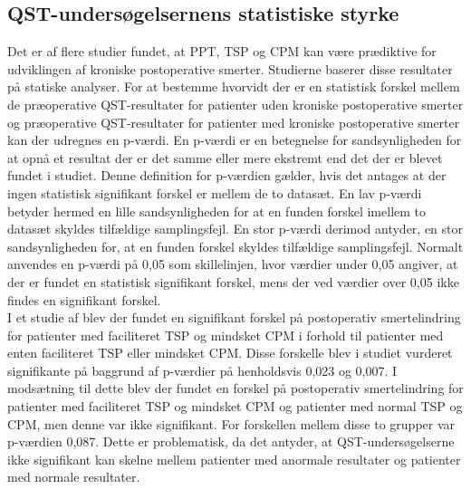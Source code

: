 \subsection{QST-undersøgelsernens statistiske styrke}
Det er af flere studier fundet, at PPT, TSP og CPM kan være prædiktive for udviklingen af kroniske postoperative smerter. \citep{Wylde2016c} \citep{Petersen2016} Studierne baserer disse resultater på statiske analyser. For at bestemme hvorvidt der er en statistisk forskel mellem de præoperative QST-resultater for patienter uden kroniske postoperative smerter og præoperative QST-resultater for patienter med kroniske postoperative smerter kan der udregnes en p-værdi. En p-værdi er en betegnelse for sandsynligheden for at opnå et resultat der er det samme eller mere ekstremt end det der er blevet fundet i studiet. Denne definition for p-værdien gælder, hvis det antages at der ingen statistisk signifikant forskel er mellem de to datasæt. En lav p-værdi betyder hermed en lille sandsynligheden for at en funden forskel imellem to datasæt skyldes tilfældige samplingsfejl. En stor p-værdi derimod antyder, en stor sandsynligheden for, at en funden forskel skyldes tilfældige samplingsfejl. Normalt anvendes en p-værdi på 0,05 som skillelinjen, hvor værdier under 0,05 angiver, at der er fundet en statistisk signifikant forskel, mens der ved værdier over 0,05 ikke findes en signifikant forskel. \citep{Zar2010} \\
I et studie af  blev der fundet en signifikant forskel på postoperativ smertelindring for patienter med faciliteret TSP og mindsket CPM i forhold til patienter med enten faciliteret TSP eller mindsket CPM. Disse forskelle blev i studiet vurderet signifikante på baggrund af p-værdier på henholdsvis 0,023 og 0,007. I modsætning til dette blev der fundet en forskel på postoperativ smertelindring for patienter med faciliteret TSP og mindsket CPM og patienter med normal TSP og CPM, men denne var ikke signifikant. For forskellen mellem disse to grupper var p-værdien 0,087. \citep{Petersen2016} Dette er problematisk, da det antyder, at QST-undersøgelserne ikke signifikant kan skelne mellem patienter med anormale resultater og patienter med normale resultater. \\ %
